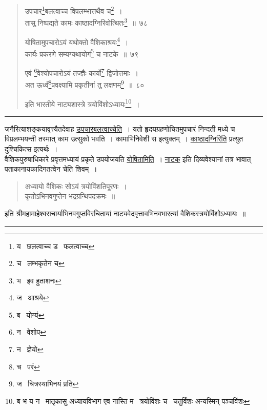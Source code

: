 \documentclass[11pt, openany]{book}
\begin{document}
\begin{quote}
{\na उपचार\renewcommand{\thefootnote}{1}\footnote{य \textendash\  छलत्वाच्च ड \textendash\  फलत्वाच्च}बलत्वाच्च विप्रलम्भात्तथैव च\renewcommand{\thefootnote}{2}\footnote{च \textendash\  लम्भकृतेन च}~।\\
तासु निष्पद्यते कामः काष्ठादग्निरिवोत्थितः\renewcommand{\thefootnote}{3}\footnote{भ \textendash\  इव हुताशनः}~॥~७८

योषितामुपचारोऽयं यथोक्तो वैशिकाश्रयः\renewcommand{\thefootnote}{4}\footnote{ज \textendash\  आश्रये}~।\\
कार्यः प्रकरणे सम्यग्यथायोगं\renewcommand{\thefootnote}{5}\footnote{ब \textendash\  योग्यं} च नाटके~॥~७९

एवं \renewcommand{\thefootnote}{6}\footnote{न \textendash\  वेशोप}वेश्योपचारोऽयं तज्ज्ञैः कार्यो\renewcommand{\thefootnote}{7}\footnote{न \textendash\  ज्ञेयो} द्विजोत्तमाः~।\\
अत ऊर्ध्वं\renewcommand{\thefootnote}{8}\footnote{च \textendash\  परं}प्रवक्ष्यामि प्रकृतीनां तु लक्षणम्\renewcommand{\thefootnote}{9}\footnote{ज \textendash\  चित्रस्याभिनयं प्रति}~॥~८०

इति भारतीये नाट्यशास्त्रे त्रयोविंशोऽध्यायः\renewcommand{\thefootnote}{10}\footnote{ब भ य न \textendash\  मातृकासु अध्यायविभाग एव नास्ति म \textendash\  त्रयोविंशः च \textendash\  चतुर्विंशः अन्यस्मिन् पञ्चविंशः}~।}
\end{quote}

\hrule

\vspace{2mm}
\noindent
जनैरित्याशङ्कयावृत्त्यैतदेवाह \underline{उपचारबलत्वाच्चेति}~। यतो हृदयग्रहणोचितमुपचारं निन्दती मध्ये च विप्रलम्भयन्ती तस्मात् काम उत्सुको भवति~। कामाभिनिवेशी स इत्युक्तम्~। \underline{काष्ठादग्निरिति} प्रत्युत दुश्चिकित्स इत्यर्थः~।\\

वैशिकपुरुषाधिकारे प्रवृत्तमध्यायं प्रकृते उपयोजयति \underline{योषितामिति}~। \underline{नाटक} इति दिव्यवेश्यानां तत्र भावात् पताकानायकादिगतत्वेन चेति शिवम्~।

\begin{quote}
{\qt अध्यायो वैशिकः सोऽयं त्रयोविंशतिपूरणः~।\\
कृतोऽभिनवगुप्तेन भद्रग्रन्थिपदक्रमः~॥}
\end{quote}

\begin{center}
इति श्रीमहामाहेश्वराचार्याभिनवगुप्तविरचितायां नाट्यवेदवृत्तावभिनवभारत्यां वैशिकस्त्रयोविंशोऽध्यायः~॥\\

\vspace{1cm}
\rule{0.2\linewidth}{0.5pt}
\end{center}
\end{document}
